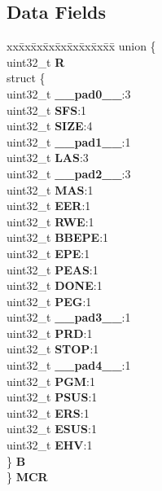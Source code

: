 \subsection*{Data Fields}
\begin{DoxyCompactItemize}
\item 
\mbox{\label{structFLASH__tag_ad6fe34b9edbe38ddad0340dc50854a92}} 
\begin{tabbing}
xx\=xx\=xx\=xx\=xx\=xx\=xx\=xx\=xx\=\kill
union \{\\
\>uint32\_t {\bfseries R}\\
\>struct \{\\
\>\>uint32\_t {\bfseries \_\_pad0\_\_}:3\\
\>\>uint32\_t {\bfseries SFS}:1\\
\>\>uint32\_t {\bfseries SIZE}:4\\
\>\>uint32\_t {\bfseries \_\_pad1\_\_}:1\\
\>\>uint32\_t {\bfseries LAS}:3\\
\>\>uint32\_t {\bfseries \_\_pad2\_\_}:3\\
\>\>uint32\_t {\bfseries MAS}:1\\
\>\>uint32\_t {\bfseries EER}:1\\
\>\>uint32\_t {\bfseries RWE}:1\\
\>\>uint32\_t {\bfseries BBEPE}:1\\
\>\>uint32\_t {\bfseries EPE}:1\\
\>\>uint32\_t {\bfseries PEAS}:1\\
\>\>uint32\_t {\bfseries DONE}:1\\
\>\>uint32\_t {\bfseries PEG}:1\\
\>\>uint32\_t {\bfseries \_\_pad3\_\_}:1\\
\>\>uint32\_t {\bfseries PRD}:1\\
\>\>uint32\_t {\bfseries STOP}:1\\
\>\>uint32\_t {\bfseries \_\_pad4\_\_}:1\\
\>\>uint32\_t {\bfseries PGM}:1\\
\>\>uint32\_t {\bfseries PSUS}:1\\
\>\>uint32\_t {\bfseries ERS}:1\\
\>\>uint32\_t {\bfseries ESUS}:1\\
\>\>uint32\_t {\bfseries EHV}:1\\
\>\} {\bfseries B}\\
\} {\bfseries MCR}\\


\end{tabbing}
\end{DoxyCompactItemize}
